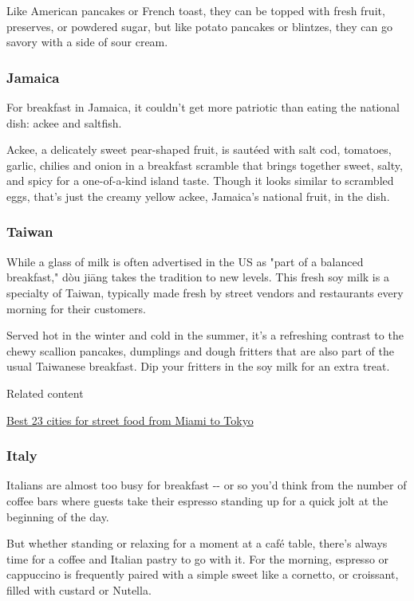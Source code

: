 Like American pancakes or French toast, they can be topped with fresh
fruit, preserves, or powdered sugar, but like potato pancakes or
blintzes, they can go savory with a side of sour cream.

\hypertarget{jamaica}{%
\subsubsection{Jamaica}\label{jamaica}}

For breakfast in Jamaica, it couldn't get more patriotic than eating the
national dish: ackee and saltfish.

Ackee, a delicately sweet pear-shaped fruit, is sautéed with salt cod,
tomatoes, garlic, chilies and onion in a breakfast scramble that brings
together sweet, salty, and spicy for a one-of-a-kind island taste.
Though it looks similar to scrambled eggs, that's just the creamy yellow
ackee, Jamaica's national fruit, in the dish.

\hypertarget{taiwan}{%
\subsubsection{Taiwan}\label{taiwan}}

While a glass of milk is often advertised in the US as "part of a
balanced breakfast," dòu jiāng takes the tradition to new levels. This
fresh soy milk is a specialty of Taiwan, typically made fresh by street
vendors and restaurants every morning for their customers.

Served hot in the winter and cold in the summer, it's a refreshing
contrast to the chewy scallion pancakes, dumplings and dough fritters
that are also part of the usual Taiwanese breakfast. Dip your fritters
in the soy milk for an extra treat.

Related content

\href{/travel/article/best-cities-street-food/index.html}{Best 23 cities
for street food from Miami to Tokyo}

\hypertarget{italy}{%
\subsubsection{Italy}\label{italy}}

Italians are almost too busy for breakfast -\/- or so you'd think from
the number of coffee bars where guests take their espresso standing up
for a quick jolt at the beginning of the day.

But whether standing or relaxing for a moment at a café table, there's
always time for a coffee and Italian pastry to go with it. For the
morning, espresso or cappuccino is frequently paired with a simple sweet
like a cornetto, or croissant, filled with custard or Nutella.

